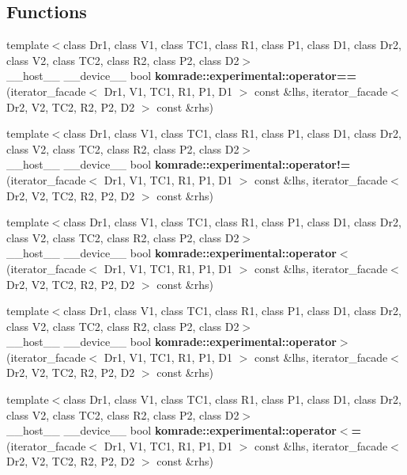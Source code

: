 \subsection*{Functions}
\begin{CompactItemize}
\item 
{\footnotesize template$<$class Dr1, class V1, class TC1, class R1, class P1, class D1, class Dr2, class V2, class TC2, class R2, class P2, class D2$>$ }\\\_\-\_\-host\_\-\_\- \_\-\_\-device\_\-\_\- bool \textbf{komrade::experimental::operator==} (iterator\_\-facade$<$ Dr1, V1, TC1, R1, P1, D1 $>$ const \&lhs, iterator\_\-facade$<$ Dr2, V2, TC2, R2, P2, D2 $>$ const \&rhs)\label{namespacekomrade_1_1experimental_c1d43437fbf28e33d0abd23a16765491}

\item 
{\footnotesize template$<$class Dr1, class V1, class TC1, class R1, class P1, class D1, class Dr2, class V2, class TC2, class R2, class P2, class D2$>$ }\\\_\-\_\-host\_\-\_\- \_\-\_\-device\_\-\_\- bool \textbf{komrade::experimental::operator!=} (iterator\_\-facade$<$ Dr1, V1, TC1, R1, P1, D1 $>$ const \&lhs, iterator\_\-facade$<$ Dr2, V2, TC2, R2, P2, D2 $>$ const \&rhs)\label{namespacekomrade_1_1experimental_12e5a9fb875a33b48b6afab86ef5f190}

\item 
{\footnotesize template$<$class Dr1, class V1, class TC1, class R1, class P1, class D1, class Dr2, class V2, class TC2, class R2, class P2, class D2$>$ }\\\_\-\_\-host\_\-\_\- \_\-\_\-device\_\-\_\- bool \textbf{komrade::experimental::operator$<$} (iterator\_\-facade$<$ Dr1, V1, TC1, R1, P1, D1 $>$ const \&lhs, iterator\_\-facade$<$ Dr2, V2, TC2, R2, P2, D2 $>$ const \&rhs)\label{namespacekomrade_1_1experimental_d2bff29a83045064df2eb5475078ff5e}

\item 
{\footnotesize template$<$class Dr1, class V1, class TC1, class R1, class P1, class D1, class Dr2, class V2, class TC2, class R2, class P2, class D2$>$ }\\\_\-\_\-host\_\-\_\- \_\-\_\-device\_\-\_\- bool \textbf{komrade::experimental::operator$>$} (iterator\_\-facade$<$ Dr1, V1, TC1, R1, P1, D1 $>$ const \&lhs, iterator\_\-facade$<$ Dr2, V2, TC2, R2, P2, D2 $>$ const \&rhs)\label{namespacekomrade_1_1experimental_ae4c33d5f71f583df2e11d971f3fee37}

\item 
{\footnotesize template$<$class Dr1, class V1, class TC1, class R1, class P1, class D1, class Dr2, class V2, class TC2, class R2, class P2, class D2$>$ }\\\_\-\_\-host\_\-\_\- \_\-\_\-device\_\-\_\- bool \textbf{komrade::experimental::operator$<$=} (iterator\_\-facade$<$ Dr1, V1, TC1, R1, P1, D1 $>$ const \&lhs, iterator\_\-facade$<$ Dr2, V2, TC2, R2, P2, D2 $>$ const \&rhs)\label{namespacekomrade_1_1experimental_4869164f1cce67d46990a08f59529c31}


\end{CompactItemize}
